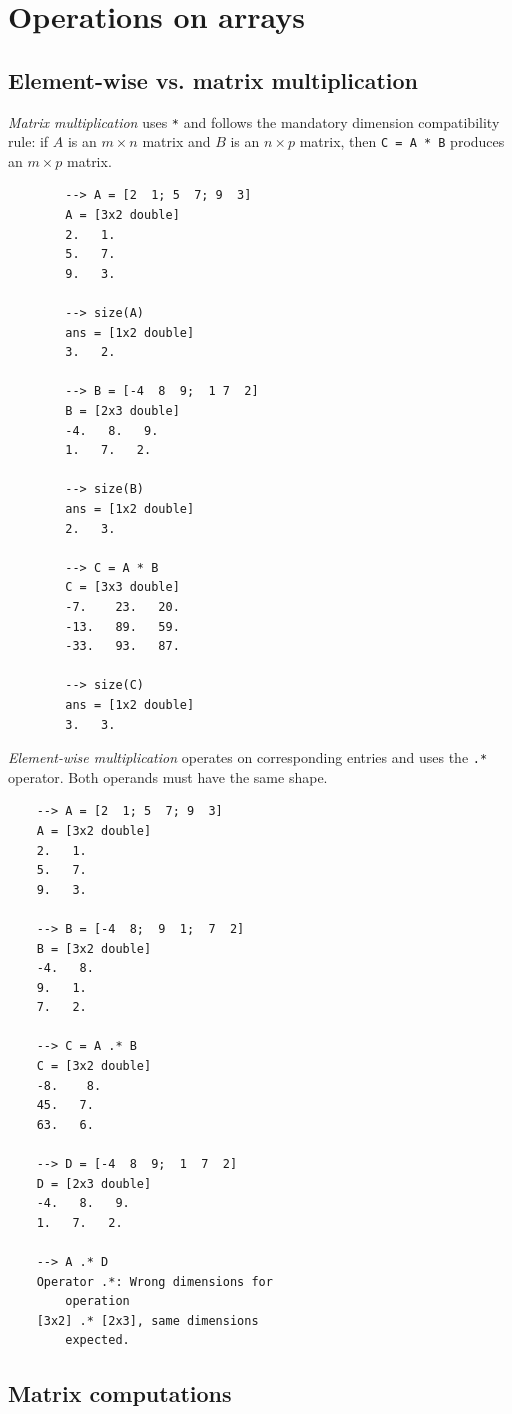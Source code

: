 \section{Operations on arrays}

\subsection{Element-wise vs. matrix multiplication}
\textit{Matrix multiplication} uses \verb|*| and follows the mandatory dimension compatibility rule: if $A$ is an $m\times n$ matrix and $B$ is an $n\times p$ matrix, then \verb|C = A * B| produces an $m\times p$ matrix.
\begin{multicols}{2}
	\begin{verbatim}
		--> A = [2  1; 5  7; 9  3]
		A = [3x2 double]
		2.   1.
		5.   7.
		9.   3.
		
		--> size(A)
		ans = [1x2 double]
		3.   2.
		
		--> B = [-4  8  9;  1 7  2]
		B = [2x3 double]
		-4.   8.   9.
		1.   7.   2.
		
		--> size(B)
		ans = [1x2 double]
		2.   3.
		
		--> C = A * B
		C = [3x3 double]
		-7.    23.   20.
		-13.   89.   59.
		-33.   93.   87.
		
		--> size(C)
		ans = [1x2 double]
		3.   3.
	\end{verbatim}
\end{multicols}

\textit{Element-wise multiplication} operates on corresponding entries and uses the \verb|.*| operator. Both operands must have the same shape.
\begin{multicols}{2}
	\begin{verbatim}
	--> A = [2  1; 5  7; 9  3]
	A = [3x2 double]
	2.   1.
	5.   7.
	9.   3.
	
	--> B = [-4  8;  9  1;  7  2]
	B = [3x2 double]
	-4.   8.
	9.   1.
	7.   2.
	
	--> C = A .* B
	C = [3x2 double]
	-8.    8.
	45.   7.
	63.   6.
	
	--> D = [-4  8  9;  1  7  2]
	D = [2x3 double]
	-4.   8.   9.
	1.   7.   2.
	
	--> A .* D
	Operator .*: Wrong dimensions for
		operation
	[3x2] .* [2x3], same dimensions
		expected.
	\end{verbatim}
\end{multicols}

\subsection{Matrix computations}

